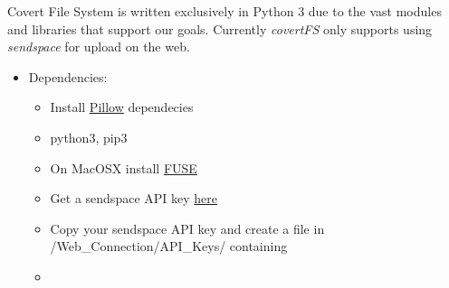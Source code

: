 \documentclass[letterpaper,10pt,english]{sphinxmanual}
\begin{document}
Covert File System is written exclusively in Python 3 due to the vast modules and libraries that support our goals. Currently \emph{covertFS} only supports using \emph{sendspace} for upload on the web.
\begin{itemize}
\item {} 
Dependencies:
\begin{itemize}
\item {} 
Install \href{https://pillow.readthedocs.org/en/3.0.0/installation.html}{Pillow} dependecies

\item {} 
python3, pip3 

\item {} 
On MacOSX install \href{https://osxfuse.github.io}{FUSE}

\item {} 
Get a sendspace API key \href{https://www.sendspace.com/dev\_apikeys.html}{here}

\item {} 
Copy your sendspace API key and create a file in /Web\_Connection/API\_Keys/ containing 

\item {} 

\end{itemize}

\end{itemize}
\end{document}
